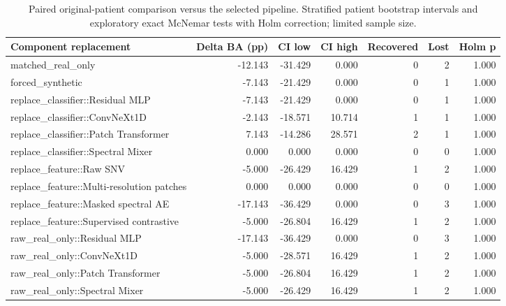 \begin{table}[t]
\centering
\caption{Paired original-patient comparison versus the selected pipeline. Stratified patient bootstrap intervals and exploratory exact McNemar tests with Holm correction; limited sample size.}
\label{tab:paired_components}
\footnotesize
\setlength{\tabcolsep}{4pt}
\begin{tabular}{lrrrrrr}
\toprule
Component replacement & Delta BA (pp) & CI low & CI high & Recovered & Lost & Holm p \\
\midrule
matched\_real\_only & -12.143 & -31.429 & 0.000 & 0 & 2 & 1.000 \\
forced\_synthetic & -7.143 & -21.429 & 0.000 & 0 & 1 & 1.000 \\
replace\_classifier::Residual MLP & -7.143 & -21.429 & 0.000 & 0 & 1 & 1.000 \\
replace\_classifier::ConvNeXt1D & -2.143 & -18.571 & 10.714 & 1 & 1 & 1.000 \\
replace\_classifier::Patch Transformer & 7.143 & -14.286 & 28.571 & 2 & 1 & 1.000 \\
replace\_classifier::Spectral Mixer & 0.000 & 0.000 & 0.000 & 0 & 0 & 1.000 \\
replace\_feature::Raw SNV & -5.000 & -26.429 & 16.429 & 1 & 2 & 1.000 \\
replace\_feature::Multi-resolution patches & 0.000 & 0.000 & 0.000 & 0 & 0 & 1.000 \\
replace\_feature::Masked spectral AE & -17.143 & -36.429 & 0.000 & 0 & 3 & 1.000 \\
replace\_feature::Supervised contrastive & -5.000 & -26.804 & 16.429 & 1 & 2 & 1.000 \\
raw\_real\_only::Residual MLP & -17.143 & -36.429 & 0.000 & 0 & 3 & 1.000 \\
raw\_real\_only::ConvNeXt1D & -5.000 & -28.571 & 16.429 & 1 & 2 & 1.000 \\
raw\_real\_only::Patch Transformer & -5.000 & -26.804 & 16.429 & 1 & 2 & 1.000 \\
raw\_real\_only::Spectral Mixer & -5.000 & -26.429 & 16.429 & 1 & 2 & 1.000 \\
\bottomrule
\end{tabular}
\end{table}
